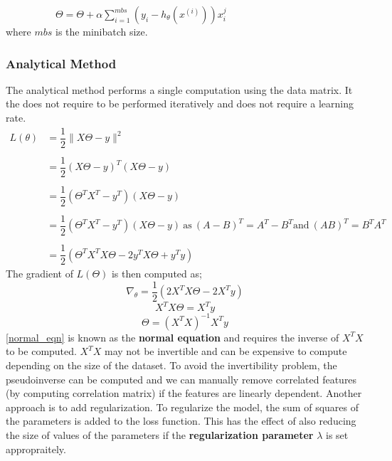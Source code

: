 \documentclass[12pt,a4paper,titlepage,landscape]{book}
\begin{document}
	${}\hspace{60pt}\Theta = \Theta + \alpha\sum_{i=1}^{mbs}\left(y_i - h_\theta(x^{(i)})\right)x_i^j $\\
	where $mbs$ is the minibatch size.
	 	
	\subsubsection{Analytical Method}
	The analytical method performs a single computation using the data matrix. It the does not require to be performed iteratively and does not require a learning rate.
	\begin{equation*}
		\begin{array}{cl}
		L(\theta) &= \dfrac{1}{2}\|X\Theta - y\|^2 \\\\
		&= \dfrac{1}{2}(X\Theta - y)^T(X\Theta - y) \\\\
		&= \dfrac{1}{2}(\Theta^{T}X^T - y^T)(X\Theta - y) \\\\
		&= \dfrac{1}{2}(\Theta^{T}X^T - y^T)(X\Theta - y) ~ \text{as} ~ (A - B)^T = A^T - B^T \text{and} ~ (AB)^T = B^TA^T \\\\
		&= \dfrac{1}{2}(\Theta^{T}X^TX\Theta - 2y^TX\Theta + y^Ty)
		\end{array}
	\end{equation*}
	The gradient of $L(\Theta)$ is then computed as;
	\begin{equation*}
		\nabla_\theta = \dfrac{1}{2}\left(2X^TX\Theta - 2X^Ty\right)
	\end{equation*}
	\begin{equation*}
	X^TX\Theta = X^Ty
	\end{equation*}
	\begin{equation}\label{normal_eqn}
	\Theta = \left(X^TX\right)^{-1}X^Ty
	\end{equation}
	\eqref{normal_eqn} is known as the \textbf{normal equation} and requires the inverse of $X^TX$ to be computed. $X^TX$ may not be invertible and can be expensive to compute depending on the size of the dataset. To avoid the invertibility problem, the pseudoinverse can be computed and we can manually remove correlated features (by computing correlation matrix) if the features are linearly dependent. Another approach is to add regularization. To regularize the model, the sum of squares of the parameters is added to the loss function. This has the effect of also reducing the size of values of the parameters if the \textbf{regularization parameter} $\lambda$ is set appropraitely.
	
\end{document}
